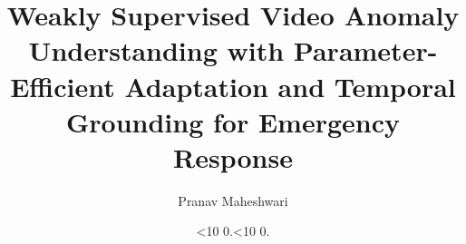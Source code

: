 \documentclass[
    numbers=noenddot,
    parskip=half-,
    fontsize=12pt,
    paper=a4,
    oneside,
    titlepage,
    bibliography=totoc,
    chapterprefix=false,
    captions=tableheading,
]{scrbook}
\title{Weakly Supervised Video Anomaly Understanding with Parameter-Efficient Adaptation and Temporal Grounding for Emergency Response}
\author{Pranav Maheshwari}
\date{\ifnum\day<10 0\fi\the\day.\ifnum\month<10 0\fi\the\month.\the\year}
\begin{document}
\frontmatter
%


\tableofcontents
\newpage


\newpage


\newpage

\thispagestyle{empty}
\cleardoublepage
\listoffigures
\newpage

\thispagestyle{empty}
\cleardoublepage
\listoftables
\newpage

\mainmatter








\begin{appendices}
    
\end{appendices}
\newpage

\backmatter

\printbibliography


\end{document}
